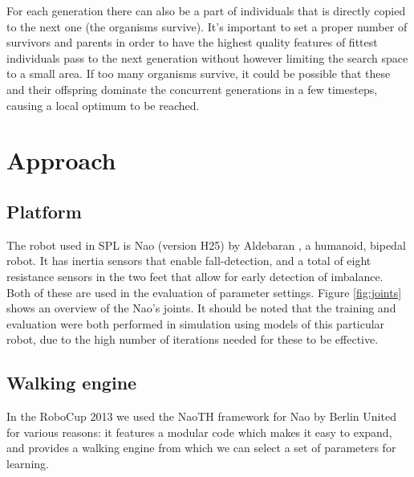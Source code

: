 \documentclass{article}
\begin{document}

For each generation there can also be a part of individuals that is directly copied to the next one (the organisms survive). It's important to set a proper number of survivors and parents in order to have the highest quality features of fittest individuals pass to the next generation without however limiting the search space to a small area. If too many organisms survive, it could be possible that these and their offspring dominate the concurrent generations in a few timesteps, causing a local optimum to be reached.


\section{Approach}
\subsection{Platform}
The robot used in SPL is Nao (version H25) by Aldebaran \citep{gouaillier2009mechatronic}, a humanoid, bipedal robot. It has inertia sensors that enable fall-detection, and a total of eight resistance sensors in the two feet that allow for early detection of imbalance. Both of these are used in the evaluation of parameter settings. Figure \ref{fig:joints} shows an overview of the Nao's joints.
It should be noted that the training and evaluation were both performed in simulation using models of this particular robot, due to the high number of iterations needed for these to be effective.

\subsection{Walking engine}
In the RoboCup 2013 we used the NaoTH framework for Nao by Berlin United
\cite{naothdescription} for various reasons: it features a modular code which
makes it easy to expand, and provides a walking engine from which we can select
a set of parameters for learning. 
\end{document}
